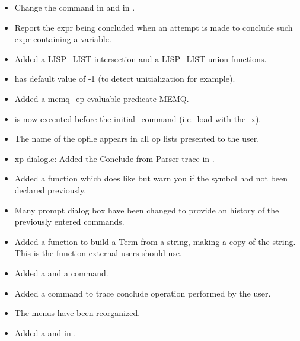 \begin{itemize}
\item Change the command  in 
and  in .

\item Report the expr being concluded when an attempt is made to conclude such
expr containing a variable.

\item Added a LISP\_LIST intersection and a LISP\_LIST union functions. 

\item {} has default value of -1 (to detect
unitialization for example).

\item Added a memq\_ep evaluable predicate MEMQ.

\item {} is now executed before the
initial\_command (i.e.\ load with the -x).

\item The name of the opfile appears in all op lists
presented to the user.

\item xp-dialog.c: Added the Conclude from Parser trace in \XPK{}.

\item Added a  function which does like 
but warn you if the symbol had not been declared previously.

\item Many prompt dialog box have been changed to provide an history of the
previously entered commands.

\item Added a  function to build a Term from
a string, making a copy of the string. This is the function external users
should use.

\item Added a  and a 
command. 

\item Added a  command to trace conclude operation
performed by the user.

\item The \XPK{} menus have been reorganized.

\item Added a  and  in \XPK{}.


\end{itemize}
